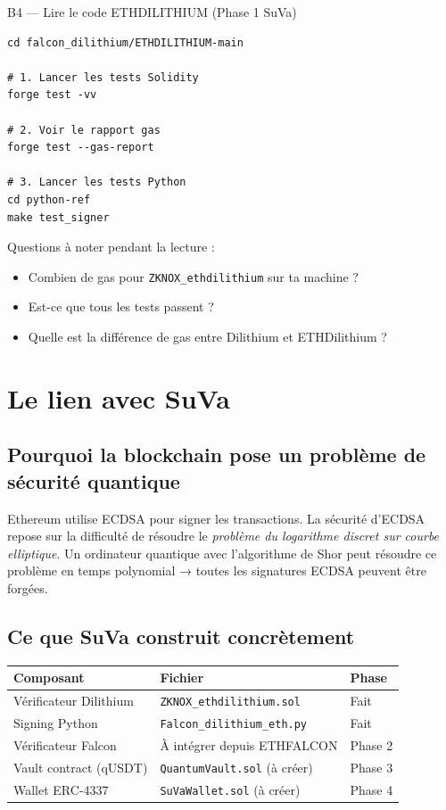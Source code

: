 \documentclass[12pt, a4paper]{article}
\begin{document}
\begin{pratique}{B4 --- Lire le code ETHDILITHIUM (Phase 1 SuVa)}
\begin{lstlisting}[style=bash]
cd falcon_dilithium/ETHDILITHIUM-main

# 1. Lancer les tests Solidity
forge test -vv

# 2. Voir le rapport gas
forge test --gas-report

# 3. Lancer les tests Python
cd python-ref
make test_signer
\end{lstlisting}
Questions à noter pendant la lecture :
\begin{itemize}
  \item Combien de gas pour \texttt{ZKNOX\_ethdilithium} sur ta machine ?
  \item Est-ce que tous les tests passent ?
  \item Quelle est la différence de gas entre Dilithium et ETHDilithium ?
\end{itemize}
\end{pratique}

\section{Le lien avec SuVa}

\subsection{Pourquoi la blockchain pose un problème de sécurité quantique}

Ethereum utilise ECDSA pour signer les transactions. La sécurité d'ECDSA repose sur la
difficulté de résoudre le \textit{problème du logarithme discret sur courbe elliptique}.
Un ordinateur quantique avec l'algorithme de Shor peut résoudre ce problème en temps
polynomial → toutes les signatures ECDSA peuvent être forgées.

\subsection{Ce que SuVa construit concrètement}

\begin{center}
\renewcommand{\arraystretch}{1.4}
\begin{tabular}{lll}
  \toprule
  \textbf{Composant} & \textbf{Fichier} & \textbf{Phase} \\
  \midrule
  Vérificateur Dilithium & \texttt{ZKNOX\_ethdilithium.sol} & Fait \\
  Signing Python & \texttt{Falcon\_dilithium\_eth.py} & Fait \\
  Vérificateur Falcon & À intégrer depuis ETHFALCON & Phase 2 \\
  Vault contract (qUSDT) & \texttt{QuantumVault.sol} (à créer) & Phase 3 \\
  Wallet ERC-4337 & \texttt{SuVaWallet.sol} (à créer) & Phase 4 \\
  \bottomrule
\end{tabular}
\end{center}
\end{document}
